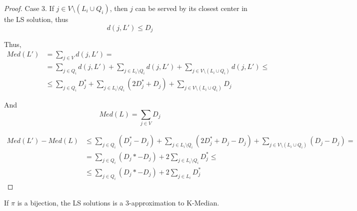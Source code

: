 \begin{proof}
        Case 3. If $j \in V \setminus (L_i \cup Q_i)$, then $j$ can be served by its closest center in the LS solution, thus
        \begin{equation*}
            d(j,L') \leq D_j
        \end{equation*}

        Thus,
        \begin{equation*}
            \begin{split}
                Med(L') &= \sum_{j \in V} d(j,L') =\\
                    &= \sum_{j \in Q_i} d(j,L') + \sum_{j \in L_i \setminus Q_i} d(j,L') + \sum_{j \in V \setminus (L_i \cup Q_i)} d(j,L') \leq\\
                    &\leq \sum_{j \in Q_i} D_j^* + \sum_{j \in L_i \setminus Q_i} (2 D_j^* + D_j) + \sum_{j \in V \setminus (L_i \cup Q_i)} D_j
            \end{split}
        \end{equation*}

        And
        \[ Med(L) = \sum_{j \in V} D_j \]

        \begin{equation*}
            \begin{split}
                Med(L') - Med(L) &\leq \sum_{j \in Q_i} (D_j^* - D_j) + \sum_{j \in L_i \setminus Q_i} (2 D_j^* + D_j - D_j) + \sum_{j \in V \setminus (L_i \cup Q_i)} (D_j - D_j) =\\
                    &= \sum_{j \in Q_i} (D_j* - D_j) + 2 \sum_{j \in L_i \setminus Q_i} D_j^* \leq\\
                    &\leq \sum_{j \in Q_i} (D_j* - D_j) + 2 \sum_{j \in L_i} D_j^*
            \end{split}
        \end{equation*}
    \end{proof}

    \begin{theorem}
        If $\pi$ is a bijection, the LS solutions is a $3$-approximation to K-Median.
    \end{theorem}


